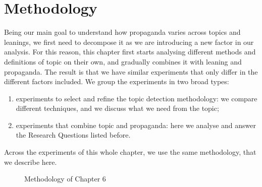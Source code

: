 




\section{Methodology}
\label{sec:topic_method}

Being our main goal to understand how propaganda varies across topics and leanings, we first need to decompose it as we are introducing a new factor in our analysis.
For this reason, this chapter first starts analysing different methods and definitions of topic on their own, and gradually combines it with leaning and propaganda. The result is that we have similar experiments that only differ in the different factors included.
We group the experiments in two broad types:
\begin{enumerate}
    \item experiments to select and refine the topic detection methodology: we compare different techniques, and we discuss what we need from the topic; 
    \item experiments that combine topic and propaganda: here we analyse and answer the Research Questions listed before.
\end{enumerate}

Across the experiments of this whole chapter, we use the same methodology, that we describe here.

\begin{figure}[!htbp]
    \centering
    \resizebox{\textwidth}{!}{
    \trimbox{2cm 1cm 2cm 1cm}{
    }}
    \caption{Methodology of Chapter 6}
    \label{fig:methodology_mindmap_chapter6}
\end{figure}


